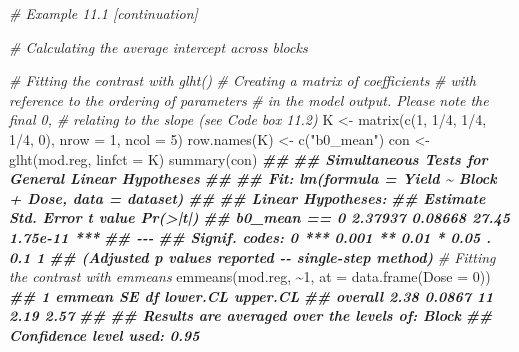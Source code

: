 \documentclass[
  12pt,
]{book}
\newenvironment{Shaded}{\begin{snugshade}}{\end{snugshade}}
\newcommand{\AttributeTok}[1]{\textcolor[rgb]{0.77,0.63,0.00}{#1}}
\newcommand{\CommentTok}[1]{\textcolor[rgb]{0.56,0.35,0.01}{\textit{#1}}}
\newcommand{\DecValTok}[1]{\textcolor[rgb]{0.00,0.00,0.81}{#1}}
\newcommand{\DocumentationTok}[1]{\textcolor[rgb]{0.56,0.35,0.01}{\textbf{\textit{#1}}}}
\newcommand{\FunctionTok}[1]{\textcolor[rgb]{0.00,0.00,0.00}{#1}}
\newcommand{\NormalTok}[1]{#1}
\newcommand{\OtherTok}[1]{\textcolor[rgb]{0.56,0.35,0.01}{#1}}
\newcommand{\SpecialCharTok}[1]{\textcolor[rgb]{0.00,0.00,0.00}{#1}}
\newcommand{\StringTok}[1]{\textcolor[rgb]{0.31,0.60,0.02}{#1}}
\begin{document}
\small
\vspace{12pt}

\begin{Shaded}
\begin{Highlighting}[]
\CommentTok{\# Example 11.1 [continuation]}

\CommentTok{\# Calculating the average intercept across blocks}

\CommentTok{\# Fitting the contrast with \textquotesingle{}glht()\textquotesingle{}}
\CommentTok{\# Creating a matrix of coefficients}
\CommentTok{\# with reference to the ordering of parameters }
\CommentTok{\# in the model output. Please note the final 0,}
\CommentTok{\# relating to the slope (see Code box 11.2)}
\NormalTok{K }\OtherTok{\textless{}{-}} \FunctionTok{matrix}\NormalTok{(}\FunctionTok{c}\NormalTok{(}\DecValTok{1}\NormalTok{, }\DecValTok{1}\SpecialCharTok{/}\DecValTok{4}\NormalTok{, }\DecValTok{1}\SpecialCharTok{/}\DecValTok{4}\NormalTok{, }\DecValTok{1}\SpecialCharTok{/}\DecValTok{4}\NormalTok{, }\DecValTok{0}\NormalTok{),}
            \AttributeTok{nrow =} \DecValTok{1}\NormalTok{, }\AttributeTok{ncol =} \DecValTok{5}\NormalTok{)}
\FunctionTok{row.names}\NormalTok{(K) }\OtherTok{\textless{}{-}} \FunctionTok{c}\NormalTok{(}\StringTok{"b0\_mean"}\NormalTok{)}
\NormalTok{con }\OtherTok{\textless{}{-}} \FunctionTok{glht}\NormalTok{(mod.reg, }\AttributeTok{linfct =}\NormalTok{ K)}
\FunctionTok{summary}\NormalTok{(con)}
\DocumentationTok{\#\# }
\DocumentationTok{\#\#   Simultaneous Tests for General Linear Hypotheses}
\DocumentationTok{\#\# }
\DocumentationTok{\#\# Fit: lm(formula = Yield \textasciitilde{} Block + Dose, data = dataset)}
\DocumentationTok{\#\# }
\DocumentationTok{\#\# Linear Hypotheses:}
\DocumentationTok{\#\#              Estimate Std. Error t value Pr(\textgreater{}|t|)    }
\DocumentationTok{\#\# b0\_mean == 0  2.37937    0.08668   27.45 1.75e{-}11 ***}
\DocumentationTok{\#\# {-}{-}{-}}
\DocumentationTok{\#\# Signif. codes:  0 \textquotesingle{}***\textquotesingle{} 0.001 \textquotesingle{}**\textquotesingle{} 0.01 \textquotesingle{}*\textquotesingle{} 0.05 \textquotesingle{}.\textquotesingle{} 0.1 \textquotesingle{} \textquotesingle{} 1}
\DocumentationTok{\#\# (Adjusted p values reported {-}{-} single{-}step method)}
\CommentTok{\# Fitting the contrast with emmeans}
\FunctionTok{emmeans}\NormalTok{(mod.reg, }\SpecialCharTok{\textasciitilde{}}\DecValTok{1}\NormalTok{, }\AttributeTok{at =} \FunctionTok{data.frame}\NormalTok{(}\AttributeTok{Dose =} \DecValTok{0}\NormalTok{))}
\DocumentationTok{\#\#  1       emmean     SE df lower.CL upper.CL}
\DocumentationTok{\#\#  overall   2.38 0.0867 11     2.19     2.57}
\DocumentationTok{\#\# }
\DocumentationTok{\#\# Results are averaged over the levels of: Block }
\DocumentationTok{\#\# Confidence level used: 0.95}
\end{Highlighting}
\end{Shaded}
\end{document}
